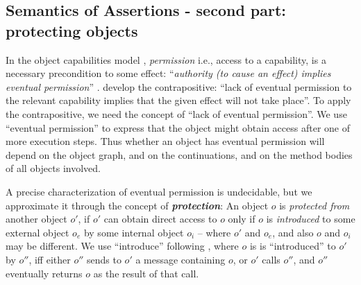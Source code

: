 \subsection{Semantics of Assertions - second part:
protecting objects}  

\label{sect:protect}
{       
In the object capabilities model \cite{MillerPhD},
\emph{permission} 
i.e.,  access to a capability, is a necessary precondition to some
effect: ``\emph{authority (to cause an effect) implies eventual permission}'' \cite{permissionAuthority}.
\citet{OOPSLA22} develop the contrapositive:
``lack of eventual
permission to the relevant capability implies that the given effect
will {not} take place''.
To apply the contrapositive, we need the concept of ``lack of  eventual permission''.  We use ``eventual permission'' to express that the object might obtain access after one of more execution steps. Thus whether an object has eventual permission will depend on the object graph, and on the continuations, and on the method bodies of all objects involved.  

A precise characterization of eventual permission is undecidable, but we approximate it through the concept of \textbf{\emph{protection}}:
{An object $o$ is \emph{protected  from} another object $o'$, if $o'$ can obtain direct access to   $o$ only if 
$o$ is \emph{introduced} to some external object $o_e$ by some internal object $o_i$ -- where $o'$ and $o_e$, and also $o$ and $o_i$ may be different.  
We  use ``introduce'' following \citet{MillerPhD}, where $o$ is is ``introduced'' to $o'$ by $o''$, iff either $o''$ sends to $o'$ a message containing $o$, 
or $o'$ calls $o''$, and $o''$ eventually returns  $o$ as the result of that call.}
 


}
